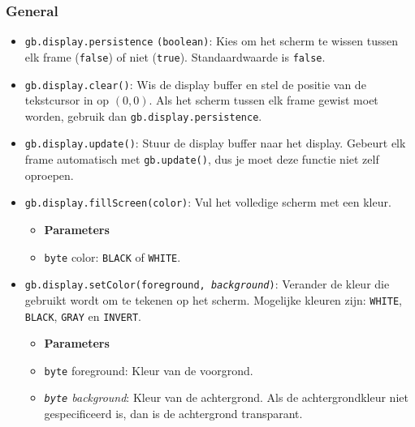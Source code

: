\documentclass[a4paper,titlepage,12pt]{article}
\begin{document}
	\subsubsection{General}
	\begin{itemize}
		\item \texttt{gb.display.persistence} \texttt{(boolean)}: Kies om het scherm te wissen tussen elk frame (\texttt{false}) of niet (\texttt{true}). Standaardwaarde is \texttt{false}.
		
		\item \texttt{gb.display.clear()}: Wis de display buffer en stel de positie van de tekstcursor in op $(0,0)$. Als het scherm tussen elk frame gewist moet worden, gebruik dan \texttt{gb.display.persistence}.
		
		\item \texttt{gb.display.update()}: Stuur de display buffer naar het display. Gebeurt elk frame automatisch met \texttt{gb.update()}, dus je moet deze functie niet zelf oproepen.
		
		\item \texttt{gb.display.fillScreen(color)}: Vul het volledige scherm met een kleur.
		\begin{itemize}
			\item [] \textbf{Parameters}
			\item \texttt{byte} color: \texttt{BLACK} of \texttt{WHITE}.
		\end{itemize}
		
		\item \texttt{gb.display.setColor(foreground, \textit{background})}: Verander de kleur die gebruikt wordt om te tekenen op het scherm. Mogelijke kleuren zijn: \texttt{WHITE}, \texttt{BLACK}, \texttt{GRAY} en \texttt{INVERT}.
		\begin{itemize}
			\item [] \textbf{Parameters}
			\item \texttt{byte} foreground: Kleur van de voorgrond.
			\item \textit{\texttt{byte} background}: Kleur van de achtergrond. Als de achtergrondkleur niet gespecificeerd is, dan is de achtergrond transparant.
		\end{itemize}
	\end{itemize}
\end{document}
